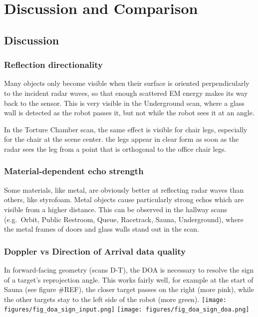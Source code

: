 
\chapter{Discussion and Comparison}\label{discussion-and-comparison}

\section{Discussion}

\subsection{Reflection directionality}\label{reflection-directionality}

Many objects only become visible when their surface is oriented
perpendicularly to the incident radar waves, so that enough scattered EM
energy makes its way back to the sensor. This is very visible in the
Underground scan, where a glass wall is detected as the robot passes it,
but not while the robot sees it at an angle.

In the Torture Chamber scan, the same effect is visible for chair legs,
especially for the chair at the scene center. the legs appear in clear
form as soon as the radar sees the leg from a point that is orthogonal
to the office chair legs.



\subsection{Material-dependent echo
strength}\label{material-dependent-echo-strength}

Some materials, like metal, are obviously better at reflecting radar
waves than others, like styrofoam. Metal objects cause particularly
strong echos which are visible from a higher distance. This can be
observed in the hallway scans (e.g.~Orbit, Public Restroom, Queue,
Racetrack, Sauna, Underground), where the metal frames of doors and
glass walls stand out in the scan.

\subsection{Doppler vs Direction of Arrival data
quality}\label{doppler-vs-direction-of-arrival-data-quality}

In forward-facing geometry (scans D-T), the DOA is necessary to resolve
the sign of a target's reprojection angle. This works fairly well, for
example at the start of Sauna (see figure \#REF), the closer target
passes on the right (more pink), while the other targets stay to the
left side of the robot (more green).
\texttt{[image: figures/fig\_doa\_sign\_input.png]}
\texttt{[image: figures/fig\_doa\_sign\_doa.png]}

